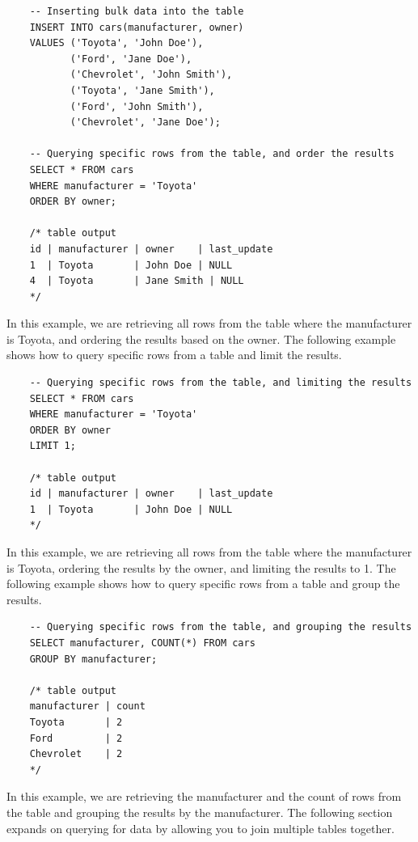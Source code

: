 \begin{verbatim}
    -- Inserting bulk data into the table
    INSERT INTO cars(manufacturer, owner)
    VALUES ('Toyota', 'John Doe'),
           ('Ford', 'Jane Doe'),
           ('Chevrolet', 'John Smith'),
           ('Toyota', 'Jane Smith'),
           ('Ford', 'John Smith'),
           ('Chevrolet', 'Jane Doe');

    -- Querying specific rows from the table, and order the results
    SELECT * FROM cars
    WHERE manufacturer = 'Toyota'
    ORDER BY owner;

    /* table output
    id | manufacturer | owner    | last_update
    1  | Toyota       | John Doe | NULL
    4  | Toyota       | Jane Smith | NULL
    */
\end{verbatim}

In this example, we are retrieving all rows from the table where the manufacturer is Toyota, and ordering the results based on the owner. The following example shows how to query specific rows from a table and limit the results.

\begin{verbatim}
    -- Querying specific rows from the table, and limiting the results
    SELECT * FROM cars
    WHERE manufacturer = 'Toyota'
    ORDER BY owner
    LIMIT 1;

    /* table output
    id | manufacturer | owner    | last_update
    1  | Toyota       | John Doe | NULL
    */
\end{verbatim}

In this example, we are retrieving all rows from the table where the manufacturer is Toyota, ordering the results by the owner, and limiting the results to 1. The following example shows how to query specific rows from a table and group the results.

\begin{verbatim}
    -- Querying specific rows from the table, and grouping the results
    SELECT manufacturer, COUNT(*) FROM cars
    GROUP BY manufacturer;

    /* table output
    manufacturer | count
    Toyota       | 2
    Ford         | 2
    Chevrolet    | 2
    */
\end{verbatim}

In this example, we are retrieving the manufacturer and the count of rows from the table and grouping the results by the manufacturer. The following section expands on querying for data by allowing you to join multiple tables together.

